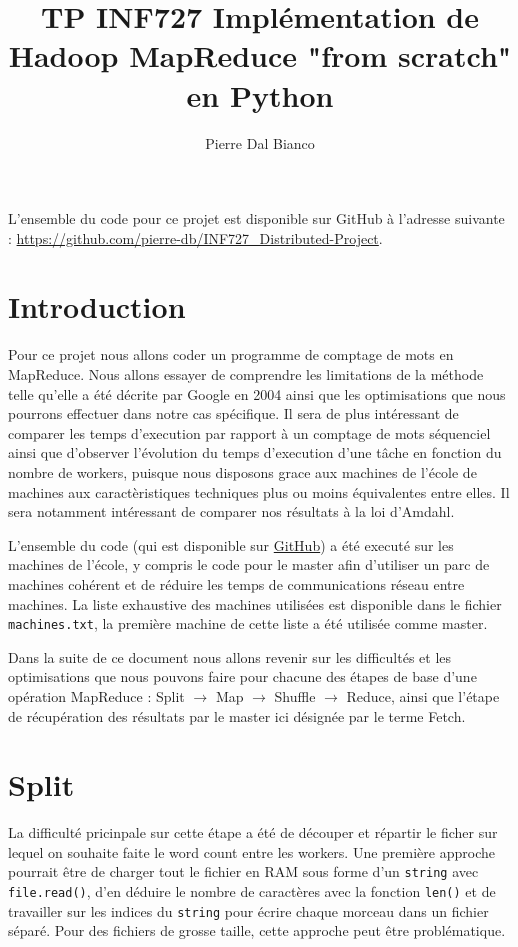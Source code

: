 \documentclass[11pt,a4paper]{article}
\title{TP INF727 \textbf{Implémentation de Hadoop MapReduce "from scratch" en Python}}
\author{Pierre Dal Bianco}
\date{}
\begin{document}
\maketitle
\hrulefill

L'ensemble du code pour ce projet est disponible sur GitHub à l'adresse suivante : \url{https://github.com/pierre-db/INF727_Distributed-Project}.

\section*{Introduction}
Pour ce projet nous allons coder un programme de comptage de mots en MapReduce. Nous allons essayer de comprendre les limitations de la méthode telle qu'elle a été décrite par Google en 2004 ainsi que les optimisations que nous pourrons effectuer dans notre cas spécifique. Il sera de plus intéressant de comparer les temps d'execution par rapport à un comptage de mots séquenciel ainsi que d'observer l'évolution du temps d'execution d'une tâche en fonction du nombre de workers, puisque nous disposons grace aux machines de l'école de machines aux caractèristiques techniques plus ou moins équivalentes entre elles. Il sera notamment intéressant de comparer nos résultats à la loi d'Amdahl.

L'ensemble du code (qui est disponible sur \href{https://github.com/pierre-db/INF727_Distributed-Project}{GitHub}) a été executé sur les machines de l'école, y compris le code pour le master afin d'utiliser un parc de machines cohérent et de réduire les temps de communications réseau entre machines. La liste exhaustive des machines utilisées est disponible dans le fichier \texttt{machines.txt}, la première machine de cette liste a été utilisée comme master.

Dans la suite de ce document nous allons revenir sur les difficultés et les optimisations que nous pouvons faire pour chacune des étapes de base d'une opération MapReduce : Split $\rightarrow$ Map $\rightarrow$ Shuffle $\rightarrow$ Reduce, ainsi que l'étape de récupération des résultats par le master ici désignée par le terme Fetch.

\section{Split}
La difficulté pricinpale sur cette étape a été de découper et répartir le ficher sur lequel on souhaite faite le word count entre les workers. Une première approche pourrait être de charger tout le fichier en RAM sous forme d'un \texttt{string} avec \texttt{file.read()}, d'en déduire le nombre de caractères avec la fonction \texttt{len()} et de travailler sur les indices du \texttt{string} pour écrire chaque morceau dans un fichier séparé. Pour des fichiers de grosse taille, cette approche peut être problématique.
\end{document}
